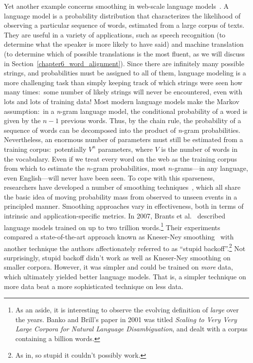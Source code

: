 Yet another example concerns smoothing in web-scale language
models~\cite{Brants_etal_EMNLP2007}.  A language model is a
probability distribution that characterizes the likelihood of
observing a particular sequence of words, estimated from a large
corpus of texts.  They are useful in a variety of applications, such
as speech recognition (to determine what the speaker is more likely to
have said) and machine translation (to determine which of possible
translations is the most fluent, as we will discuss in
Section~\ref{chapter6_word_alignment}).  Since there are infinitely
many possible strings, and probabilities must be assigned to all of
them, language modeling is a more challenging task than simply keeping
track of which strings were seen how many times:\ some number of
likely strings will never be encountered, even with lots and lots of
training data!  Most modern language models make the Markov
assumption:\ in a \emph{n}-gram language model, the conditional
probability of a word is given by the $n-1$ previous words.  Thus, by
the chain rule, the probability of a sequence of words can be
decomposed into the product of \emph{n}-gram probabilities.
Nevertheless, an enormous number of parameters must still be estimated
from a training corpus:\ potentially $V^n$ parameters, where $V$ is
the number of words in the vocabulary.  Even if we treat every word on
the web as the training corpus from which to estimate the $n$-gram
probabilities, most $n$-grams---in any language, even English---will
never have been seen.  To cope with this sparseness, researchers have
developed a number of smoothing
techniques~\cite{Chen_Goodman_ACL1996,Manning_Schutze_1999,Jurafsky_Martin_2009},
which all share the basic idea of moving probability mass from
observed to unseen events in a principled manner.  Smoothing
approaches vary in effectiveness, both in terms of intrinsic and
application-specific metrics.  In 2007, Brants et
al.~\cite{Brants_etal_EMNLP2007} described language models trained on
up to two trillion words.\footnote{As an aside, it is interesting to
  observe the evolving definition of \emph{large} over the years.
  Banko and Brill's paper in 2001 was titled \emph{Scaling to Very Very
    Large Corpora for Natural Language Disambiguation}, and dealt with
  a corpus containing a billion words.}  Their experiments compared a
state-of-the-art approach known as Kneser-Ney
smoothing~\cite{Chen_Goodman_ACL1996} with another technique the
authors affectionately referred to as ``stupid backoff''.\footnote{As
  in, so stupid it couldn't possibly work.}  Not surprisingly, stupid
backoff didn't work as well as Kneser-Ney smoothing on smaller
corpora.  However, it was simpler and could be trained on \emph{more}
data, which ultimately yielded better language models.  That is, a
simpler technique on more data beat a more sophisticated technique on
less data.

